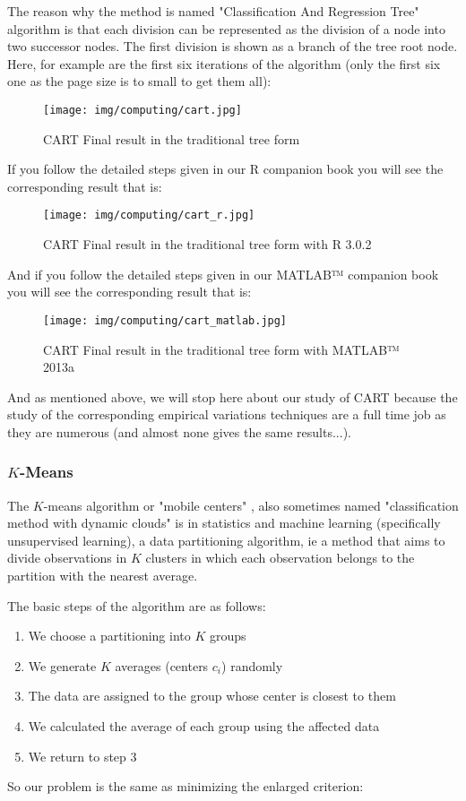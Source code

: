 	The reason why the method is named "Classification And Regression Tree" algorithm is that each division can be represented as the division of a node into two successor nodes. The first division is shown as a branch of the tree root node. Here, for example are the first six iterations of the algorithm (only the first six one as the page size is to small to get them all):
	\begin{figure}[H]
		\centering
		\texttt{[image: img/computing/cart.jpg]}
		\caption{CART Final result in the traditional tree form}
	\end{figure}
	If you follow the detailed steps given in our R companion book you will see the corresponding result that is:
	\begin{figure}[H]
		\centering
		\texttt{[image: img/computing/cart\_r.jpg]}
		\caption[]{CART Final result in the traditional tree form with R 3.0.2}
	\end{figure}
	And if you follow the detailed steps given in our MATLAB™ companion book you will see the corresponding result that is:
	\begin{figure}[H]
		\centering
		\texttt{[image: img/computing/cart\_matlab.jpg]}
		\caption[]{CART Final result in the traditional tree form with MATLAB™ 2013a}
	\end{figure}
	And as mentioned above, we will stop here about our study of CART because the study of the corresponding empirical variations techniques are a full time job as they are numerous (and almost none gives the same results...).
	
	
	\subsubsection{$K$-Means}
	The $K$-means algorithm or "mobile centers" , also sometimes named "classification method with dynamic clouds" is in statistics and machine learning (specifically unsupervised learning), a data partitioning algorithm, ie a method that aims to divide observations in $K$ clusters in which each observation belongs to the partition with the nearest average.

	The basic steps of the algorithm are as follows:
	\begin{enumerate}
		\item We choose a partitioning into $K$ groups

		\item We generate $K$ averages (centers $c_i$) randomly

		\item  The data are assigned to the group whose center is closest to them

		\item We calculated the average of each group using the affected data

		\item We return to step 3
	\end{enumerate}	
	So our problem is the same as minimizing the enlarged criterion:
	
